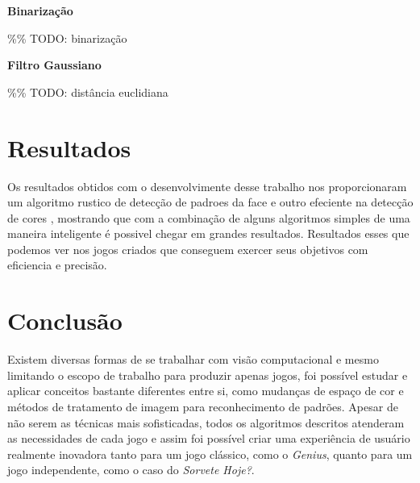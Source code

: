 \documentclass[a4paper]{article}
\begin{document}
\begin{flushleft}
\textbf{\large Binarização}
\end{flushleft}
\%\% TODO: binarização



\begin{flushleft}
\textbf{\large Filtro Gaussiano}
\end{flushleft}
\%\% TODO: distância euclidiana





\section{ Resultados}

Os resultados obtidos com o desenvolvimente desse trabalho nos proporcionaram um algoritmo rustico de detecção de padroes da face e outro efeciente na detecção de cores , mostrando que com a combinação de alguns algoritmos simples de uma maneira inteligente é possivel chegar em grandes resultados. Resultados esses que podemos ver nos jogos criados que conseguem exercer seus objetivos com eficiencia e precisão.


\section{Conclusão}


Existem diversas formas de se trabalhar com visão computacional e mesmo limitando o escopo de trabalho para produzir apenas jogos, foi possível estudar e aplicar conceitos bastante diferentes entre si, como mudanças de espaço de cor e métodos de tratamento de imagem para reconhecimento de padrões. Apesar de não serem as técnicas mais sofisticadas, todos os algoritmos descritos atenderam as necessidades de cada jogo e assim foi possível criar uma experiência de usuário realmente inovadora tanto para um jogo clássico, como o \textit{Genius}, quanto para um jogo independente, como o caso do \textit{Sorvete Hoje?}. 
\end{document}
